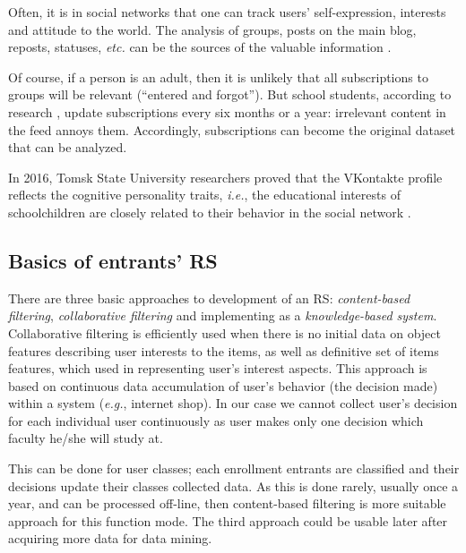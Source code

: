 \documentclass[conference]{IEEEtran}
\begin{document}
Often, it is in social networks that one can track users' self-expression, interests and attitude to the world. The analysis of groups, posts on the main blog, reposts, statuses, \emph{etc.} can be the sources of the valuable information \cite{c7}.

Of course, if a person is an adult, then it is unlikely that all subscriptions to groups will be relevant (``entered and forgot'').  But school students, according to research \cite{c11}, update subscriptions every six months or a year: irrelevant content in the feed annoys them.  Accordingly, subscriptions can become the original dataset that can be analyzed.

In 2016, Tomsk State University researchers proved that the VKontakte profile reflects the cognitive personality traits, \emph{i.e.}, the educational interests of schoolchildren are closely related to their behavior in the social network \cite{c9}.


\subsection{Basics of entrants' RS}

There are three basic approaches to development of an RS: \emph{content-based filtering}, \emph{collaborative filtering} and implementing as a \emph{knowledge-based system}.  Collaborative filtering is efficiently used when there is no initial data on object features describing user interests to the items, as well as definitive set of items features, which used in representing user's interest aspects.  This approach is based on continuous data accumulation of user's behavior (the decision made) within a system (\emph{e.g.}, internet shop).  In our case we cannot collect user's decision for each individual user continuously as user makes only one decision which faculty he/she will study at.

This can be done for user classes; each enrollment entrants are classified and their decisions update their classes collected data.  As this is done rarely, usually once a year, and can be processed off-line, then content-based filtering is more suitable approach for this function mode.  The third approach could be usable later after acquiring more data for data mining.

\end{document}
